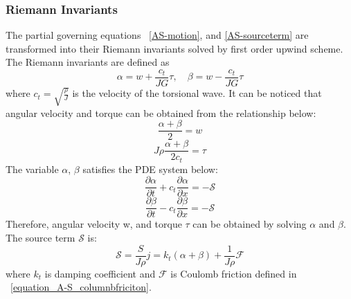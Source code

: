 \subsubsection{Riemann Invariants}
The partial governing equations \equationname~\ref{AS-motion}, and \ref{AS-sourceterm} are transformed into their Riemann invariants solved by first order upwind scheme. The Riemann invariants are defined as
\begin{equation}\label{AS-Riemann}
  \alpha = w + \frac{c_t}{JG}\tau, \quad \beta=w-\frac{c_t}{JG}\tau
\end{equation}
where $c_t = \sqrt{\frac{\rho}{J}}$ is the velocity of the torsional wave. It can be noticed that angular velocity and torque can be obtained from the relationship below: 
\begin{equation}\label{equation_Riemann_relation1}
  \frac{\alpha + \beta}{2} = w
\end{equation}
\begin{equation}\label{equation_Riemann_relation2}
  J \rho \frac{\alpha + \beta}{2c_t} = \tau
\end{equation}
The variable $\alpha$, $\beta$ satisfies the PDE system below: 
\begin{equation}\label{AS-Riemann_alpha}
  \frac{\partial \alpha}{\partial t} + c_t\frac{\partial \alpha}{\partial x} = -\mathcal{S}
\end{equation}
\begin{equation}\label{AS-Riemann_beta}
  \frac{\partial \beta}{\partial t} - c_t\frac{\partial \beta}{\partial x} = -\mathcal{S}
\end{equation}
Therefore, angular velocity w, and torque $\tau$ can be obtained by solving $\alpha$ and $\beta$.
The source term $\mathcal{S}$ is:
\begin{equation}\label{AS-source}
  \mathcal{S} = \frac{S}{J \rho} j= k_t(\alpha + \beta) + \frac{1}{J \rho} \mathcal{F}
\end{equation}
where $k_t$ is damping coefficient and $\mathcal{F}$ is Coulomb friction defined in \equationname~\ref{equation_A-S_columnbfriciton}. 
